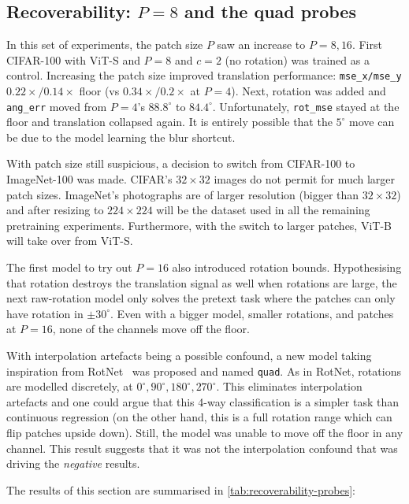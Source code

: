 \documentclass[final_report.tex]{subfiles}
\begin{document}
\subsection{Recoverability: \texorpdfstring{$P=8$}{P=8} and the quad probes}\label{sec:recoverability}
In this set of experiments, the patch size $P$ saw an increase to $P=8,16$. First CIFAR-100 with ViT-S and $P=8$ and $c=2$ (no rotation) was trained as a control. Increasing the patch size improved translation performance: \texttt{mse\_x/mse\_y} $0.22\times / 0.14\times$ floor (vs $0.34\times / 0.2\times$ at $P=4$). Next, rotation was added and \texttt{ang\_err} moved from $P=4$'s $88.8^\circ$ to $84.4^\circ$. Unfortunately, \texttt{rot\_mse} stayed at the floor and translation collapsed again. It is entirely possible that the $5^\circ$ move can be due to the model learning the blur shortcut.

With patch size still suspicious, a decision to switch from CIFAR-100 to ImageNet-100 was made. CIFAR's $32\times32$ images do not permit for much larger patch sizes. ImageNet's photographs are of larger resolution (bigger than $32\times32$) and after resizing to $224\times224$ will be the dataset used in all the remaining pretraining experiments. Furthermore, with the switch to larger patches, ViT-B will take over from ViT-S.

The first model to try out $P=16$ also introduced rotation bounds. Hypothesising that rotation destroys the translation signal as well when rotations are large, the next raw-rotation model only solves the pretext task where the patches can only have rotation in $\pm30^\circ$. Even with a bigger model, smaller rotations, and patches at $P=16$, none of the channels move off the floor.

With interpolation artefacts being a possible confound, a new model taking inspiration from RotNet~\cite{rotnet} was proposed and named \texttt{quad}. As in RotNet, rotations are modelled discretely, at $0^\circ,90^\circ,180^\circ,270^\circ$. This eliminates interpolation artefacts and one could argue that this 4-way classification is a simpler task than continuous regression (on the other hand, this is a full rotation range which can flip patches upside down). Still, the model was unable to move off the floor in any channel. This result suggests that it was not the interpolation confound that was driving the \emph{negative} results.

The results of this section are summarised in \cref{tab:recoverability-probes}:
\end{document}
